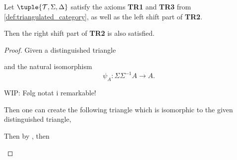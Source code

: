 \begin{lemma}
    Let \( \tuple{ \Tc, \Sigma, \Delta } \) satisfy the axioms {\bf TR1} and {\bf TR3} from \autoref{def:triangulated_category}, as well as the left shift part of {\bf TR2}.

    Then the right shift part of {\bf TR2} is also satisfied.
\end{lemma}
\begin{proof}
    Given a distinguished triangle
    \begin{center}
    \end{center}
    and the natural isomorphism
    \[
        \psi_A: \Sigma \Sigma^{-1} A \to A.
    \]

    WIP: Følg notat i remarkable!
    
    Then one can create the following triangle which is isomorphic to the given distinguished triangle,
    \begin{center}
    \end{center}

    Then by \cite[Chapter 1, Subsection 1.3, Lemma]{Happel_1988}, then

    \begin{center}
\end{center}
\end{proof}
